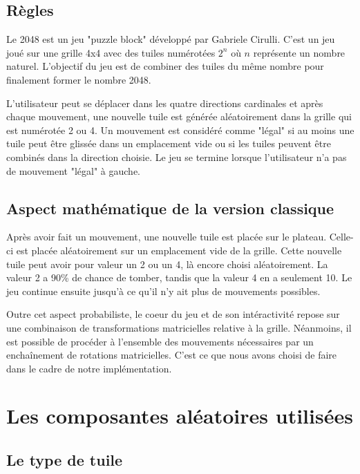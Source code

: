 \documentclass[12pt]{report}
\begin{document}
\section{Règles}

\tabto{1cm}Le 2048 est un jeu "puzzle block" développé par Gabriele Cirulli. C'est un jeu joué sur
une grille 4x4 avec des tuiles numérotées ${2^{n}}$ où ${n}$ représente un nombre naturel. L'objectif
du jeu est de combiner des tuiles du même nombre pour finalement former le nombre 2048.

\vspace{0.5cm}

\tabto{1cm}L'utilisateur peut se déplacer dans les quatre directions cardinales et après chaque mouvement,
une nouvelle tuile est générée aléatoirement dans la grille qui est numérotée 2 ou 4. Un mouvement est
considéré comme "légal" si au moins une tuile peut être glissée dans un emplacement vide ou si les tuiles
peuvent être combinés dans la direction choisie. Le jeu se termine lorsque l'utilisateur n'a pas de mouvement
"légal" à gauche.

\section{Aspect mathématique de la version classique}

\tabto{1cm}Après avoir fait un mouvement, une nouvelle tuile est placée sur le plateau.
Celle-ci est placée aléatoirement sur un emplacement vide de la grille. Cette nouvelle tuile
peut avoir pour valeur un 2 ou un 4, là encore choisi aléatoirement. La valeur 2 a 90\% de chance
de tomber, tandis que la valeur 4 en a seulement 10. Le jeu continue ensuite jusqu'à ce qu'il n'y
ait plus de mouvements possibles.

\vspace{0.5cm}

\tabto{1cm}Outre cet aspect probabiliste, le coeur du jeu et de son intéractivité repose sur une
combinaison de transformations matricielles relative à la grille. Néanmoins, il est possible de
procéder à l'ensemble des mouvements nécessaires par un enchaînement de rotations matricielles.
C'est ce que nous avons choisi de faire dans le cadre de notre implémentation.

\chapter{Les composantes aléatoires utilisées}

\section{Le type de tuile}
\end{document}
